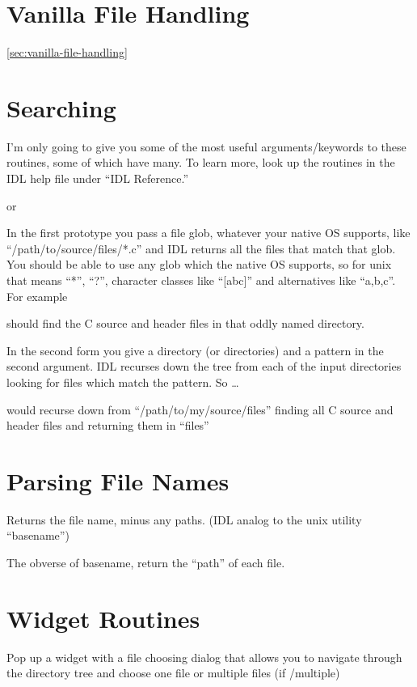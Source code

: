 \section{Vanilla File Handling}\ref{sec:vanilla-file-handling}

\section{Searching}

I'm only going to give you some of the most useful arguments/keywords
to these routines, some of which have many. To learn more, look up the
routines in the IDL help file under ``IDL Reference.''


or 


In the first prototype you pass a file glob, whatever your native OS
supports, like ``/path/to/source/files/*.c'' and IDL returns all the
files that match that glob. You should be able to use any glob which the native OS supports, so for unix that means ``*'', ``?'', character classes like ``[abc]'' and alternatives like ``{a,b,c}''. For example


should find the C source and header files in that oddly named
directory.

In the second form you give a directory (or directories) and a pattern
in the second argument. IDL recurses down the tree from each of the input directories looking for files which match the pattern. So \ldots


would recurse down from ``/path/to/my/source/files'' finding all C
source and header files and returning them in ``files''



\section{Parsing File Names}


Returns the file name, minus any paths. (IDL analog to the unix
utility ``basename'')


The obverse of basename, return the ``path'' of each file.



\section{Widget Routines}


Pop up a widget with a file choosing dialog that allows you to
navigate through the directory tree and choose one file or multiple
files (if /multiple)
